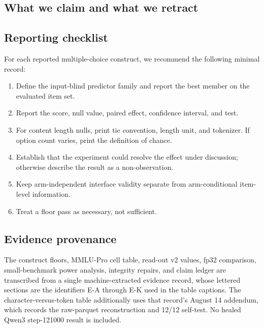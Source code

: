 

\FloatBarrier

\subsection{What we claim and what we retract}
\label{app:ledger}



\FloatBarrier

\subsection{Reporting checklist}

For each reported multiple-choice construct, we recommend the following minimal record:
\begin{enumerate}[leftmargin=*]
    \item Define the input-blind predictor family and report the best member on the evaluated item set.
    \item Report the score, null value, paired effect, confidence interval, and test.
    \item For content length nulls, print tie convention, length unit, and tokenizer. If option count varies, print the definition of chance.
    \item Establish that the experiment could resolve the effect under discussion; otherwise describe the result as a non-observation.
    \item Keep arm-independent interface validity separate from arm-conditional item-level information.
    \item Treat a floor pass as necessary, not sufficient.
\end{enumerate}

\subsection{Evidence provenance}
\label{app:provenance}

The construct floors, MMLU-Pro cell table, read-out v2 values, fp32 comparison, small-benchmark power analysis, integrity repairs, and claim ledger are transcribed from a single machine-extracted evidence record, whose lettered sections are the identifiers \textsf{E-A} through \textsf{E-K} used in the table captions. The character-versus-token table additionally uses that record's August 14 addendum, which records the raw-parquet reconstruction and 12/12 self-test. No healed Qwen3 step-121000 result is included.


